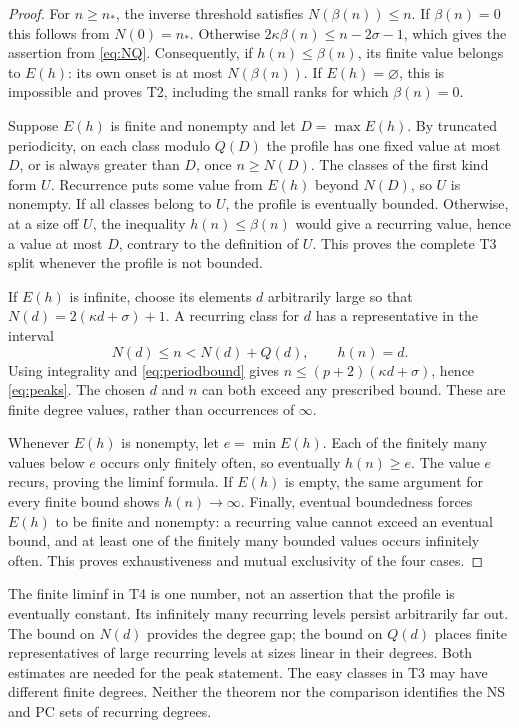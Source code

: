 \begin{proof}
For $n\ge n_*$, the inverse threshold satisfies $N(\beta(n))\le n$.
If $\beta(n)=0$ this follows from $N(0)=n_*$. Otherwise
$2\kappa\beta(n)\le n-2\sigma-1$, which gives the assertion from
\eqref{eq:NQ}. Consequently, if $h(n)\le\beta(n)$, its finite value
belongs to $E(h)$: its own onset is at most $N(\beta(n))$.
If $E(h)=\varnothing$, this is impossible and proves T2, including the
small ranks for which $\beta(n)=0$.

Suppose $E(h)$ is finite and nonempty and let $D=\max E(h)$.
By truncated periodicity, on each class modulo $Q(D)$ the profile has
one fixed value at most $D$, or is always greater than $D$, once
$n\ge N(D)$. The classes of the first kind form $U$. Recurrence puts
some value from $E(h)$ beyond $N(D)$, so $U$ is nonempty. If all classes
belong to $U$, the profile is eventually bounded. Otherwise, at a size
off $U$, the inequality $h(n)\le\beta(n)$ would give a recurring value,
hence a value at most $D$, contrary to the definition of $U$.
This proves the complete T3 split whenever the profile is not bounded.

If $E(h)$ is infinite, choose its elements $d$ arbitrarily large so that
$N(d)=2(\kappa d+\sigma)+1$. A recurring class for $d$ has a
representative in the interval
\[
              N(d)\le n<N(d)+Q(d),\qquad h(n)=d.
\]
Using integrality and \eqref{eq:periodbound} gives
$n\le(p+2)(\kappa d+\sigma)$, hence \eqref{eq:peaks}. The chosen $d$
and $n$ can both exceed any prescribed bound. These are finite degree
values, rather than occurrences of $\infty$.

Whenever $E(h)$ is nonempty, let $e=\min E(h)$. Each of the finitely
many values below $e$ occurs only finitely often, so eventually
$h(n)\ge e$. The value $e$ recurs, proving the liminf formula. If $E(h)$
is empty, the same argument for every finite bound shows $h(n)\to\infty$.
Finally, eventual boundedness forces $E(h)$ to be finite and nonempty:
a recurring value cannot exceed an eventual bound, and at least one of
the finitely many bounded values occurs infinitely often. This proves
exhaustiveness and mutual exclusivity of the four cases.
\end{proof}

The finite liminf in T4 is one number, not an assertion that the profile
is eventually constant. Its infinitely many recurring levels persist
arbitrarily far out. The bound on $N(d)$ provides the degree gap; the
bound on $Q(d)$ places finite representatives of large recurring levels
at sizes linear in their degrees. Both estimates are needed for the peak
statement. The easy classes in T3 may have different finite degrees.
Neither the theorem nor the comparison identifies the NS and PC sets of
recurring degrees.

